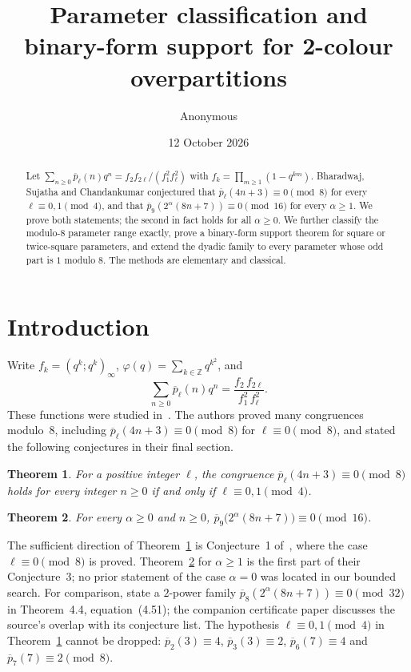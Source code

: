 \documentclass[11pt]{article}
\title{Parameter classification and binary-form support for 2-colour overpartitions}
\author{Anonymous}\date{12 October 2026}
\newtheorem{theorem}{Theorem}\newtheorem{lemma}[theorem]{Lemma}
\theoremstyle{remark}\newtheorem{remark}[theorem]{Remark}
\newcommand{\pb}{\overline{p}}
\begin{document}
\maketitle
\begin{abstract}
Let $\sum_{n\ge0}\pb_\ell(n)q^n=f_2f_{2\ell}/(f_1^2f_\ell^2)$ with $f_k=\prod_{m\ge1}(1-q^{km})$. Bharadwaj, Sujatha and Chandankumar conjectured that $\pb_\ell(4n+3)\equiv0\pmod 8$ for every $\ell\equiv0,1\pmod4$, and that $\pb_9(2^\alpha(8n+7))\equiv0\pmod{16}$ for every $\alpha\ge1$. We prove both statements; the second in fact holds for all $\alpha\ge0$. We further classify the modulo-$8$ parameter range exactly, prove a binary-form support theorem for square or twice-square parameters, and extend the dyadic family to every parameter whose odd part is $1$ modulo $8$. The methods are elementary and classical.
\end{abstract}

\section{Introduction}
Write $f_k=(q^k;q^k)_\infty$, $\varphi(q)=\sum_{k\in\mathbb Z}q^{k^2}$, and
\[\sum_{n\ge0}\pb_\ell(n)q^n=\frac{f_2\,f_{2\ell}}{f_1^2\,f_\ell^2}.\]
These functions were studied in~\cite{BSC}. The authors proved many congruences modulo~8, including $\pb_\ell(4n+3)\equiv0\pmod 8$ for $\ell\equiv0\pmod8$, and stated the following conjectures in their final section.

\begin{theorem}\label{thm:one}
For a positive integer $\ell$, the congruence $\pb_\ell(4n+3)\equiv0\pmod8$ holds for every integer $n\ge0$ if and only if $\ell\equiv0,1\pmod4$.
\end{theorem}

\begin{theorem}\label{thm:two}
For every $\alpha\ge0$ and $n\ge0$, $\pb_9\bigl(2^\alpha(8n+7)\bigr)\equiv0\pmod{16}$.
\end{theorem}

The sufficient direction of Theorem~\ref{thm:one} is Conjecture~1 of~\cite{BSC}, where the case $\ell\equiv0\pmod 8$ is proved. Theorem~\ref{thm:two} for $\alpha\ge1$ is the first part of their Conjecture~3; no prior statement of the case $\alpha=0$ was located in our bounded search. For comparison, \cite{BSC} state a $2$-power family $\pb_8(2^\alpha(8n+7))\equiv0\pmod{32}$ in Theorem~4.4, equation~(4.51); the companion certificate paper discusses the source's overlap with its conjecture list. The hypothesis $\ell\equiv0,1\pmod4$ in Theorem~\ref{thm:one} cannot be dropped: $\pb_2(3)\equiv4$, $\pb_3(3)\equiv2$, $\pb_6(7)\equiv4$ and $\pb_7(7)\equiv2\pmod 8$.
\end{document}
